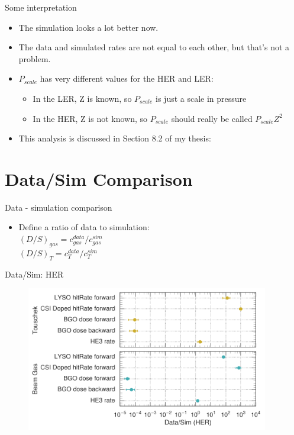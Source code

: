 \documentclass[xcolor=dvipsnames]{beamer}
\begin{document}
\begin{frame}{Some interpretation}
\begin{itemize}
	\item
	The simulation looks a lot better now.
	\item
	The data and simulated rates are not equal to each other, but that's not a problem.
	\item
	$P_{scale}$ has very different values for the HER and LER:
	\begin{itemize}
		\item
		In the LER, Z is known, so $P_{scale}$ is just a scale in pressure
		\item
		In the HER, Z is not known, so $P_{scale}$ should really be called $P_{scale}Z^2$
	\end{itemize}	
	\item
	This analysis is discussed in Section 8.2 of my thesis: \href{https://www.dropbox.com/s/jji6kuvv6u854s7/mainthesisUVIC.pdf?dl=0}{\color{blue}{Dropbox link}}

\end{itemize}
\end{frame}

\section{Data/Sim Comparison}

\begin{frame}{Data - simulation comparison}
\begin{itemize}
	\item
	Define a ratio of data to simulation:
	\\ \Large
	$(D/S)_{gas} = c_{gas}^{data}/c_{gas}^{sim}$\\ \vspace{0.25cm}
	$(D/S)_{T} = c_{T}^{data}/c_{T}^{sim}$\\

\end{itemize}
\end{frame}

\begin{frame}{Data/Sim: HER}
\begin{figure}	
	\includegraphics[height=2.5in]{../figs/Results/HERRatioPlot}
\end{figure}
\end{frame}
\end{document}

